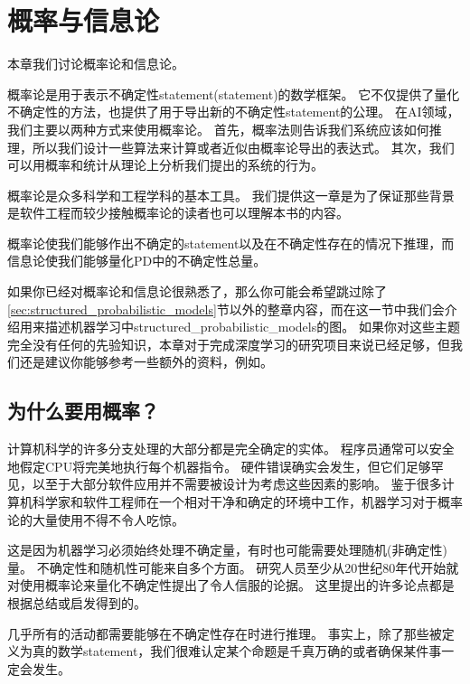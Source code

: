 \chapter{概率与信息论}
\label{chap:probability_and_information_theory}

本章我们讨论概率论和信息论。

概率论是用于表示不确定性\gls{statement}(statement)的数学框架。%
它不仅提供了量化不确定性的方法，也提供了用于导出新的不确定性\gls{statement}的公理。
在\gls{AI}领域，我们主要以两种方式来使用概率论。
首先，概率法则告诉我们系统应该如何推理，所以我们设计一些算法来计算或者近似由概率论导出的表达式。
其次，我们可以用概率和统计从理论上分析我们提出的系统的行为。

概率论是众多科学和工程学科的基本工具。
我们提供这一章是为了保证那些背景是软件工程而较少接触概率论的读者也可以理解本书的内容。

概率论使我们能够作出不确定的\gls{statement}以及在不确定性存在的情况下推理，而信息论使我们能够量化\gls{PD}中的不确定性总量。

如果你已经对概率论和信息论很熟悉了，那么你可能会希望跳过除了\ref{sec:structured_probabilistic_models}节以外的整章内容，而在这一节中我们会介绍用来描述机器学习中\gls{structured_probabilistic_models}的图。
如果你对这些主题完全没有任何的先验知识，本章对于完成深度学习的研究项目来说已经足够，但我们还是建议你能够参考一些额外的资料，例如\cite{Jaynes03}。


\section{为什么要用概率？}
\label{sec:why_probability}

计算机科学的许多分支处理的大部分都是完全确定的实体。
程序员通常可以安全地假定CPU将完美地执行每个机器指令。
硬件错误确实会发生，但它们足够罕见，以至于大部分软件应用并不需要被设计为考虑这些因素的影响。
鉴于很多计算机科学家和软件工程师在一个相对干净和确定的环境中工作，机器学习对于概率论的大量使用不得不令人吃惊。

这是因为机器学习必须始终处理不确定量，有时也可能需要处理随机(非确定性)量。
不确定性和随机性可能来自多个方面。
研究人员至少从20世纪80年代开始就对使用概率论来量化不确定性提出了令人信服的论据。
这里提出的许多论点都是根据\cite{Pearl88}总结或启发得到的。

几乎所有的活动都需要能够在不确定性存在时进行推理。
事实上，除了那些被定义为真的数学\gls{statement}，我们很难认定某个命题是千真万确的或者确保某件事一定会发生。

